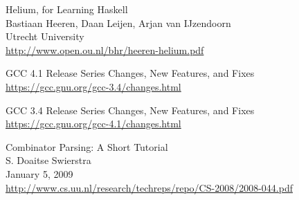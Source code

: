 \begin{thebibliography}{99}
	Helium, for Learning Haskell\\
	Bastiaan Heeren, Daan Leijen, Arjan van IJzendoorn\\
	Utrecht University\\
	\url{http://www.open.ou.nl/bhr/heeren-helium.pdf}
	
	GCC 4.1 Release Series Changes, New Features, and Fixes\\
	\url{https://gcc.gnu.org/gcc-3.4/changes.html}

	GCC 3.4 Release Series Changes, New Features, and Fixes\\
	\url{https://gcc.gnu.org/gcc-4.1/changes.html}
	
  Combinator Parsing: A Short Tutorial\\
  S. Doaitse Swierstra\\
  January 5, 2009\\
  \url{http://www.cs.uu.nl/research/techreps/repo/CS-2008/2008-044.pdf}
  
\end{thebibliography}